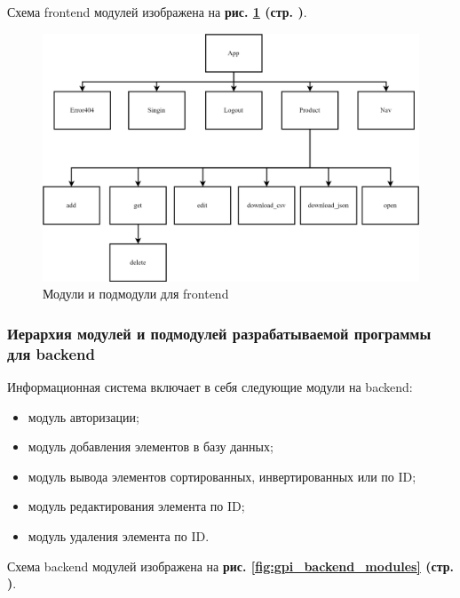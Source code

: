 Схема frontend модулей изображена на
\textbf{рис. \ref{fig:gpi_frontend_modules} (стр. \pageref{fig:gpi_frontend_modules})}.

\begin{figure}[!htp]
    \centering
    \includegraphics[width=13.7cm]
        {_assets/gpi_frontend_modules.png}
    \caption{Модули и подмодули для frontend}
    \label{fig:gpi_frontend_modules}
\end{figure}

\newpage

\subsubsection*{Иерархия модулей и подмодулей разрабатываемой программы для backend}

Информационная система включает в себя следующие модули на backend:

\begin{itemize}
    \item модуль авторизации;
    \item модуль добавления элементов в базу данных;
    \item модуль вывода элементов сортированных, инвертированных или по ID;
    \item модуль редактирования элемента по ID;
    \item модуль удаления элемента по ID.
\end{itemize}

Схема backend модулей изображена на
\textbf{рис. \ref{fig:gpi_backend_modules} (стр. \pageref{fig:gpi_backend_modules})}.

